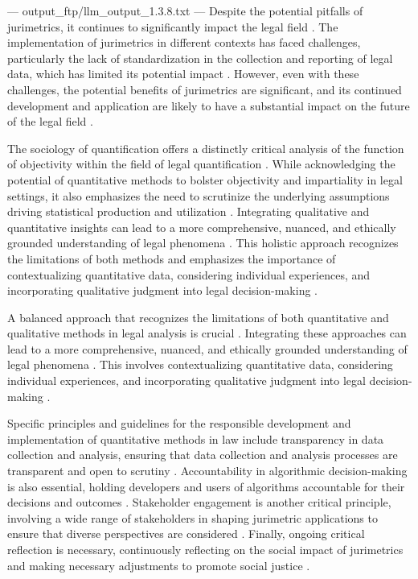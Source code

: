 ---
output_ftp/llm_output_1.3.8.txt
---
Despite the potential pitfalls of jurimetrics, it continues to significantly impact the legal field \cite{10.1007/s11186-021-09453-1,10.3390/fi9040068}. The implementation of jurimetrics in different contexts has faced challenges, particularly the lack of standardization in the collection and reporting of legal data, which has limited its potential impact \cite{10.1007/s11186-021-09453-1,10.3390/fi9040068}. However, even with these challenges, the potential benefits of jurimetrics are significant, and its continued development and application are likely to have a substantial impact on the future of the legal field \cite{10.1007/s11186-021-09453-1,10.3390/fi9040068}.

The sociology of quantification offers a distinctly critical analysis of the function of objectivity within the field of legal quantification \cite{10.1007/s11186-021-09453-1,10.3390/fi9040068}. While acknowledging the potential of quantitative methods to bolster objectivity and impartiality in legal settings, it also emphasizes the need to scrutinize the underlying assumptions driving statistical production and utilization \cite{10.1007/s11186-021-09453-1,10.3390/fi9040068}. Integrating qualitative and quantitative insights can lead to a more comprehensive, nuanced, and ethically grounded understanding of legal phenomena \cite{10.1007/s11186-021-09453-1,10.3390/fi9040068}. This holistic approach recognizes the limitations of both methods and emphasizes the importance of contextualizing quantitative data, considering individual experiences, and incorporating qualitative judgment into legal decision-making \cite{10.1007/s11186-021-09453-1,10.3390/fi9040068}.

A balanced approach that recognizes the limitations of both quantitative and qualitative methods in legal analysis is crucial \cite{10.1007/s11186-021-09453-1,10.3390/fi9040068}. Integrating these approaches can lead to a more comprehensive, nuanced, and ethically grounded understanding of legal phenomena \cite{10.1007/s11186-021-09453-1,10.3390/fi9040068}. This involves contextualizing quantitative data, considering individual experiences, and incorporating qualitative judgment into legal decision-making \cite{10.1007/s11186-021-09453-1,10.3390/fi9040068}.

Specific principles and guidelines for the responsible development and implementation of quantitative methods in law include transparency in data collection and analysis, ensuring that data collection and analysis processes are transparent and open to scrutiny \cite{10.1007/s11186-021-09453-1,10.3390/fi9040068}. Accountability in algorithmic decision-making is also essential, holding developers and users of algorithms accountable for their decisions and outcomes \cite{10.1007/s11186-021-09453-1,10.3390/fi9040068}. Stakeholder engagement is another critical principle, involving a wide range of stakeholders in shaping jurimetric applications to ensure that diverse perspectives are considered \cite{10.1007/s11186-021-09453-1,10.3390/fi9040068}. Finally, ongoing critical reflection is necessary, continuously reflecting on the social impact of jurimetrics and making necessary adjustments to promote social justice \cite{10.1007/s11186-021-09453-1,10.3390/fi9040068}.


